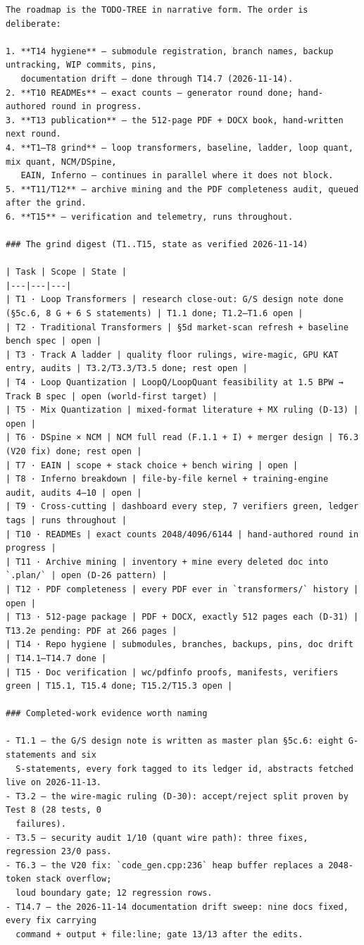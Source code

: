 \begin{Verbatim}[breaklines,breakanywhere,fontsize=\footnotesize]
The roadmap is the TODO-TREE in narrative form. The order is deliberate:

1. **T14 hygiene** — submodule registration, branch names, backup untracking, WIP commits, pins,
   documentation drift — done through T14.7 (2026-11-14).
2. **T10 READMEs** — exact counts — generator round done; hand-authored round in progress.
3. **T13 publication** — the 512-page PDF + DOCX book, hand-written next round.
4. **T1–T8 grind** — loop transformers, baseline, ladder, loop quant, mix quant, NCM/DSpine,
   EAIN, Inferno — continues in parallel where it does not block.
5. **T11/T12** — archive mining and the PDF completeness audit, queued after the grind.
6. **T15** — verification and telemetry, runs throughout.

### The grind digest (T1..T15, state as verified 2026-11-14)

| Task | Scope | State |
|---|---|---|
| T1 · Loop Transformers | research close-out: G/S design note done (§5c.6, 8 G + 6 S statements) | T1.1 done; T1.2–T1.6 open |
| T2 · Traditional Transformers | §5d market-scan refresh + baseline bench spec | open |
| T3 · Track A ladder | quality floor rulings, wire-magic, GPU KAT entry, audits | T3.2/T3.3/T3.5 done; rest open |
| T4 · Loop Quantization | LoopQ/LoopQuant feasibility at 1.5 BPW → Track B spec | open (world-first target) |
| T5 · Mix Quantization | mixed-format literature + MX ruling (D-13) | open |
| T6 · DSpine × NCM | NCM full read (F.1.1 + I) + merger design | T6.3 (V20 fix) done; rest open |
| T7 · EAIN | scope + stack choice + bench wiring | open |
| T8 · Inferno breakdown | file-by-file kernel + training-engine audit, audits 4–10 | open |
| T9 · Cross-cutting | dashboard every step, 7 verifiers green, ledger tags | runs throughout |
| T10 · READMEs | exact counts 2048/4096/6144 | hand-authored round in progress |
| T11 · Archive mining | inventory + mine every deleted doc into `.plan/` | open (D-26 pattern) |
| T12 · PDF completeness | every PDF ever in `transformers/` history | open |
| T13 · 512-page package | PDF + DOCX, exactly 512 pages each (D-31) | T13.2e pending: PDF at 266 pages |
| T14 · Repo hygiene | submodules, branches, backups, pins, doc drift | T14.1–T14.7 done |
| T15 · Doc verification | wc/pdfinfo proofs, manifests, verifiers green | T15.1, T15.4 done; T15.2/T15.3 open |

### Completed-work evidence worth naming

- T1.1 — the G/S design note is written as master plan §5c.6: eight G-statements and six
  S-statements, every fork tagged to its ledger id, abstracts fetched live on 2026-11-13.
- T3.2 — the wire-magic ruling (D-30): accept/reject split proven by Test 8 (28 tests, 0
  failures).
- T3.5 — security audit 1/10 (quant wire path): three fixes, regression 23/0 pass.
- T6.3 — the V20 fix: `code_gen.cpp:236` heap buffer replaces a 2048-token stack overflow;
  loud boundary gate; 12 regression rows.
- T14.7 — the 2026-11-14 documentation drift sweep: nine docs fixed, every fix carrying
  command + output + file:line; gate 13/13 after the edits.


\end{Verbatim}
